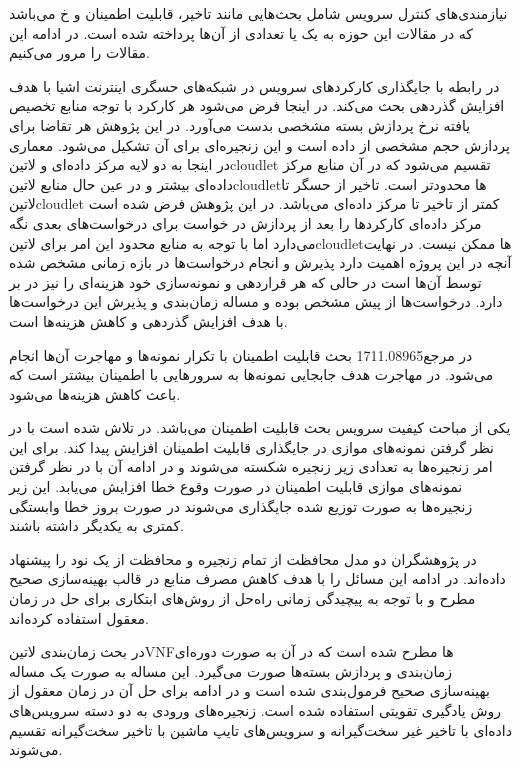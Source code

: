 نیازمندی‌های کنترل سرویس شامل بحث‌هایی مانند تاخیر، قابلیت اطمینان و ‌خ می‌باشد که در مقالات این حوزه به یک یا تعدادی از آن‌ها پرداخته شده است. در ادامه این مقالات را مرور می‌کنیم.

 در رابطه با جایگذاری کارکردهای سرویس در شبکه‌های حسگری اینترنت اشیا با هدف افزایش گذردهی بحث می‌کند. در اینجا فرض می‌شود هر کارکرد با توجه منابع تخصیص یافته نرخ پردازش بسته مشخصی بدست می‌آورد.
در این پژوهش هر تقاضا برای پردازش حجم مشخصی از داده است و این زنجیره‌ای برای آن تشکیل می‌شود. معماری در اینجا به دو لایه مرکز داده‌ای و ‌لاتین{cloudlet} تقسیم می‌شود که در آن منابع مرکز داده‌ای بیشتر
و در عین حال منابع ‌لاتین{cloudlet}ها محدودتر است. تاخیر از حسگر تا ‌لاتین{cloudlet} کمتر از تاخیر تا مرکز داده‌ای می‌باشد. در این پژوهش فرض شده است مرکز داده‌ای کارکردها را بعد از پردازش
در خواست برای درخواست‌های بعدی نگه می‌دارد اما با توجه به منابع محدود این امر برای ‌لاتین{cloudlet}ها ممکن نیست.
در نهایت آنچه در این پروژه اهمیت دارد پذیرش و انجام درخواست‌ها در بازه زمانی مشخص شده توسط آن‌ها است در حالی که هر قراردهی و نمونه‌سازی خود هزینه‌ای را نیز در بر دارد.
درخواست‌ها از پیش مشخص بوده و مساله زمان‌بندی و پذیرش این درخواست‌ها با هدف افزایش گذردهی و کاهش هزینه‌ها است.

در مرجع{1711.08965} بحث قابلیت اطمینان با تکرار نمونه‌ها و مهاجرت آن‌ها انجام می‌شود. در مهاجرت هدف جابجایی نمونه‌ها به سرورهایی با اطمینان بیشتر است که باعث کاهش هزینه‌ها می‌شود.

یکی از مباحث کیفیت سرویس بحث قابلیت اطمینان می‌باشد. در  تلاش شده است با در نظر گرفتن نمونه‌های موازی در جایگذاری قابلیت اطمینان افزایش پیدا کند. برای این امر زنجیره‌ها به تعدادی زیر زنجیره شکسته می‌شوند
و در ادامه آن با در نظر گرفتن نمونه‌های موازی قابلیت اطمینان در صورت وقوع خطا افزایش می‌یابد. این زیر زنجیره‌ها به صورت توزیع شده جایگذاری می‌شوند در صورت بروز خطا وابستگی کمتری به یکدیگر داشته باشند.

در  پژوهشگران دو مدل محافظت از تمام زنجیره و محافظت از یک نود را پیشنهاد داده‌اند. در ادامه این مسائل را با هدف کاهش مصرف منابع در قالب بهینه‌سازی صحیح مطرح و با توجه به پیچیدگی زمانی راه‌حل از روش‌های
ابتکاری برای حل در زمان معقول استفاده کرده‌اند.

در  بحث زمان‌بندی ‌لاتین{VNF}ها مطرح شده است که در آن به صورت دوره‌ای زمان‌بندی و پردازش بسته‌ها صورت می‌گیرد. این مساله به صورت یک مساله بهینه‌سازی صحیح فرمول‌بندی شده است و در ادامه برای حل آن در زمان معقول
از روش یادگیری تقویتی استفاده شده است. زنجیره‌های ورودی به دو دسته سرویس‌های داده‌ای با تاخیر غیر سخت‌گیرانه و سرویس‌های تایپ ماشین با تاخیر سخت‌گیرانه تقسیم می‌شوند.


